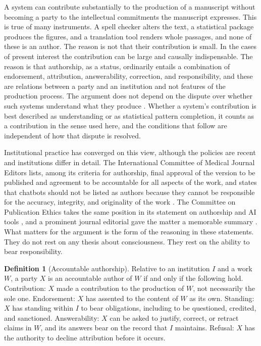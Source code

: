 \documentclass[12pt]{article}
\theoremstyle{definition}
\newtheorem{definition}{Definition}
\theoremstyle{plain}
\begin{document}
A system can contribute substantially to the production of a manuscript without becoming a party to the intellectual commitments the manuscript expresses. This is true of many instruments. A spell checker alters the text, a statistical package produces the figures, and a translation tool renders whole passages, and none of these is an author. The reason is not that their contribution is small. In the cases of present interest the contribution can be large and causally indispensable. The reason is that authorship, as a status, ordinarily entails a combination of endorsement, attribution, answerability, correction, and responsibility, and these are relations between a party and an institution and not features of the production process. The argument does not depend on the dispute over whether such systems understand what they produce \cite{bender2021, piantadosi2022}. Whether a system's contribution is best described as understanding or as statistical pattern completion, it counts as a contribution in the sense used here, and the conditions that follow are independent of how that dispute is resolved.

Institutional practice has converged on this view, although the policies are recent and institutions differ in detail. The International Committee of Medical Journal Editors lists, among its criteria for authorship, final approval of the version to be published and agreement to be accountable for all aspects of the work, and states that chatbots should not be listed as authors because they cannot be responsible for the accuracy, integrity, and originality of the work \cite{icmje}. The Committee on Publication Ethics takes the same position in its statement on authorship and AI tools \cite{cope2023}, and a prominent journal editorial gave the matter a memorable summary \cite{thorp2023}. What matters for the argument is the form of the reasoning in these statements. They do not rest on any thesis about consciousness. They rest on the ability to bear responsibility.

\begin{definition}[Accountable authorship]\label{def:author}
Relative to an institution $I$ and a work $W$, a party $X$ is an accountable author of $W$ if and only if the following hold. Contribution: $X$ made a contribution to the production of $W$, not necessarily the sole one. Endorsement: $X$ has assented to the content of $W$ as its own. Standing: $X$ has standing within $I$ to bear obligations, including to be questioned, credited, and sanctioned. Answerability: $X$ can be asked to justify, correct, or retract claims in $W$, and its answers bear on the record that $I$ maintains. Refusal: $X$ has the authority to decline attribution before it occurs.
\end{definition}
\end{document}
